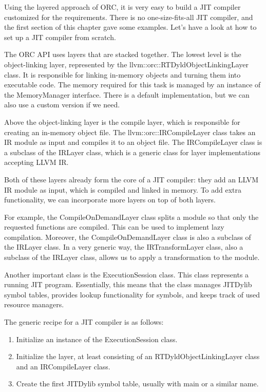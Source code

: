 
Using the layered approach of ORC, it is very easy to build a JIT compiler customized for the requirements. There is no one-size-fits-all JIT compiler, and the first section of this chapter gave some examples. Let’s have a look at how to set up a JIT compiler from scratch.

The ORC API uses layers that are stacked together. The lowest level is the object-linking layer, represented by the llvm::orc::RTDyldObjectLinkingLayer class. It is responsible for linking in-memory objects and turning them into executable code. The memory required for this task is managed by an instance of the MemoryManager interface. There is a default implementation, but we can also use a custom version if we need.

Above the object-linking layer is the compile layer, which is responsible for creating an in-memory object file. The llvm::orc::IRCompileLayer class takes an IR module as input and compiles it to an object file. The IRCompileLayer class is a subclass of the IRLayer class, which is a generic class for layer implementations accepting LLVM IR.

Both of these layers already form the core of a JIT compiler: they add an LLVM IR module as input, which is compiled and linked in memory. To add extra functionality, we can incorporate more layers on top of both layers.

For example, the CompileOnDemandLayer class splits a module so that only the requested functions are compiled. This can be used to implement lazy compilation. Moreover, the CompileOnDemandLayer class is also a subclass of the IRLayer class. In a very generic way, the IRTransformLayer class, also a subclass of the IRLayer class, allows us to apply a transformation to the module.

Another important class is the ExecutionSession class. This class represents a running JIT program. Essentially, this means that the class manages JITDylib symbol tables, provides lookup functionality for symbols, and keeps track of used resource managers.

The generic recipe for a JIT compiler is as follows:

\begin{enumerate}
\item
Initialize an instance of the ExecutionSession class.

\item
Initialize the layer, at least consisting of an RTDyldObjectLinkingLayer class and an IRCompileLayer class.

\item
Create the first JITDylib symbol table, usually with main or a similar name.
\end{enumerate}

